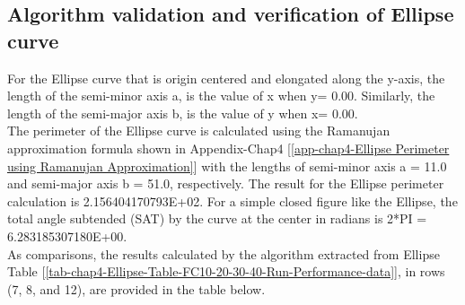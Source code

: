 \clearpage
\pagebreak

\subsection{Algorithm validation and verification of Ellipse curve}
\label{ssec-Algorithm validation and verification of Ellipse curve}

For the Ellipse curve that is origin centered and elongated along the y-axis, the length of the semi-minor axis a, is the value of x when y= 0.00. Similarly, the length of the semi-major axis b, is the value of y when x= 0.00. \\

The perimeter of the Ellipse curve is calculated using the Ramanujan approximation formula shown in Appendix-Chap4 [\ref{app-chap4-Ellipse Perimeter using Ramanujan Approximation}] with the lengths of semi-minor axis a = 11.0 and semi-major axis b = 51.0, respectively. The result for the Ellipse perimeter calculation is 2.156404170793E+02. For a simple closed figure like the Ellipse, the total angle subtended (SAT) by the curve at the center in radians is 2*PI = 6.283185307180E+00. \\

As comparisons, the results calculated by the algorithm extracted from Ellipse Table [\ref{tab-chap4-Ellipse-Table-FC10-20-30-40-Run-Performance-data}], in rows (7, 8, and 12), are provided in the table below. \\

